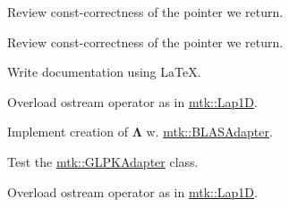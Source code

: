 \begin{DoxyRefList}
\item[\label{todo__todo000013}%
\hypertarget{todo__todo000013}{}%
Member \hyperlink{classmtk_1_1UniStgGrid3D_abf4aba911a3f0654e1852cdc9deb7fd7}{mtk\+:\+:Uni\+Stg\+Grid3\+D\+:\+:discrete\+\_\+domain\+\_\+y} () const ]Review const-\/correctness of the pointer we return.  
\item[\label{todo__todo000014}%
\hypertarget{todo__todo000014}{}%
Member \hyperlink{classmtk_1_1UniStgGrid3D_ac98305ff4a6f6d9c8cc49b4c0377547f}{mtk\+:\+:Uni\+Stg\+Grid3\+D\+:\+:discrete\+\_\+domain\+\_\+z} () const ]Review const-\/correctness of the pointer we return.  
\item[\label{todo__todo000015}%
\hypertarget{todo__todo000015}{}%
File \hyperlink{mtk__blas__adapter_8cc}{mtk\+\_\+blas\+\_\+adapter.cc} ]Write documentation using La\+Te\+X. 
\item[\label{todo__todo000020}%
\hypertarget{todo__todo000020}{}%
File \hyperlink{mtk__div__1d_8cc}{mtk\+\_\+div\+\_\+1d.cc} ]Overload ostream operator as in \hyperlink{classmtk_1_1Lap1D}{mtk\+::\+Lap1\+D}.

Implement creation of $ \mathbf{\Lambda}$ w. \hyperlink{classmtk_1_1BLASAdapter}{mtk\+::\+B\+L\+A\+S\+Adapter}.  
\item[\label{todo__todo000031}%
\hypertarget{todo__todo000031}{}%
File \hyperlink{mtk__glpk__adapter__test_8cc}{mtk\+\_\+glpk\+\_\+adapter\+\_\+test.cc} ]Test the \hyperlink{classmtk_1_1GLPKAdapter}{mtk\+::\+G\+L\+P\+K\+Adapter} class.  
\item[\label{todo__todo000022}%
\hypertarget{todo__todo000022}{}%
File \hyperlink{mtk__grad__1d_8cc}{mtk\+\_\+grad\+\_\+1d.cc} ]Overload ostream operator as in \hyperlink{classmtk_1_1Lap1D}{mtk\+::\+Lap1\+D}.


\end{DoxyRefList}
